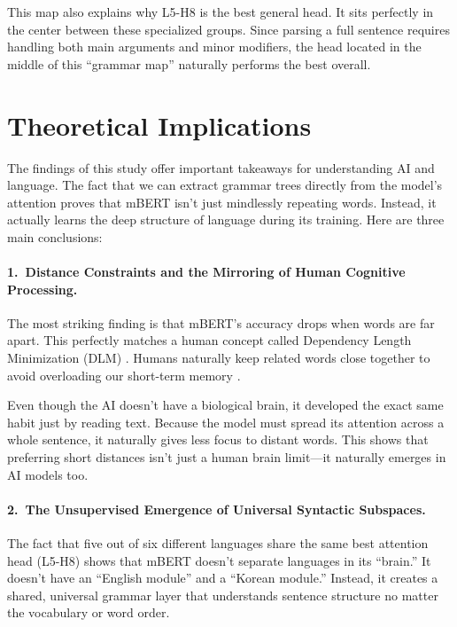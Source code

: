 \documentclass[11pt, a4paper]{article}
\begin{document}
This map also explains why L5-H8 is the best general head. It sits perfectly in the center between these specialized groups. Since parsing a full sentence requires handling both main arguments and minor modifiers, the head located in the middle of this ``grammar map'' naturally performs the best overall.

\section{Theoretical Implications}

The findings of this study offer important takeaways for understanding AI and language. The fact that we can extract grammar trees directly from the model's attention proves that mBERT isn't just mindlessly repeating words. Instead, it actually learns the deep structure of language during its training. Here are three main conclusions:

\paragraph{1.\ Distance Constraints and the Mirroring of Human Cognitive Processing.}
The most striking finding is that mBERT's accuracy drops when words are far apart. This perfectly matches a human concept called Dependency Length Minimization (DLM) \citep{futrell2015dlm}. Humans naturally keep related words close together to avoid overloading our short-term memory \citep{gibson2000dependency}. 

Even though the AI doesn't have a biological brain, it developed the exact same habit just by reading text. Because the model must spread its attention across a whole sentence, it naturally gives less focus to distant words. This shows that preferring short distances isn't just a human brain limit—it naturally emerges in AI models too.

\paragraph{2.\ The Unsupervised Emergence of Universal Syntactic Subspaces.}
The fact that five out of six different languages share the same best attention head (L5-H8) shows that mBERT doesn't separate languages in its ``brain.'' It doesn't have an ``English module'' and a ``Korean module.'' Instead, it creates a shared, universal grammar layer that understands sentence structure no matter the vocabulary or word order.
\end{document}
